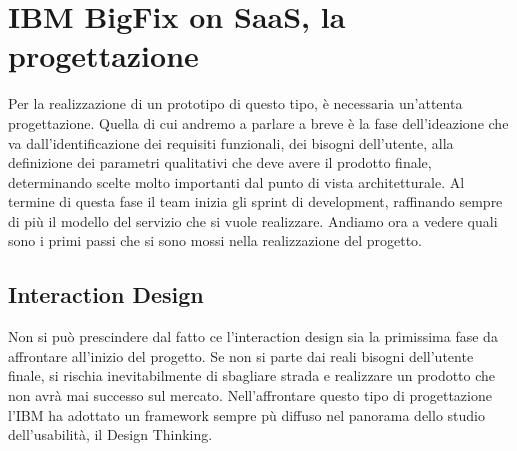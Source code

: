 \chapter{IBM BigFix on SaaS, la progettazione}
Per la realizzazione di un prototipo di questo tipo, è necessaria un'attenta progettazione. Quella di cui andremo a parlare a breve è la fase dell'ideazione che va dall'identificazione dei requisiti funzionali, dei bisogni dell'utente, alla definizione dei parametri qualitativi che deve avere il prodotto finale, determinando scelte molto importanti dal punto di vista architetturale. Al termine di questa fase il team inizia gli sprint di development, raffinando sempre di più il modello del servizio che si vuole realizzare. Andiamo ora a vedere quali sono i primi passi che si sono mossi nella realizzazione del progetto.

\section{Interaction Design}
Non si può prescindere dal fatto ce l'interaction design sia la primissima fase da affrontare all'inizio del progetto. Se non si parte dai reali bisogni dell'utente finale, si rischia inevitabilmente di sbagliare strada e realizzare un prodotto che non avrà mai successo sul mercato. Nell'affrontare questo tipo di progettazione l'IBM ha adottato un framework sempre pù diffuso nel panorama dello studio dell'usabilità, il Design Thinking.

